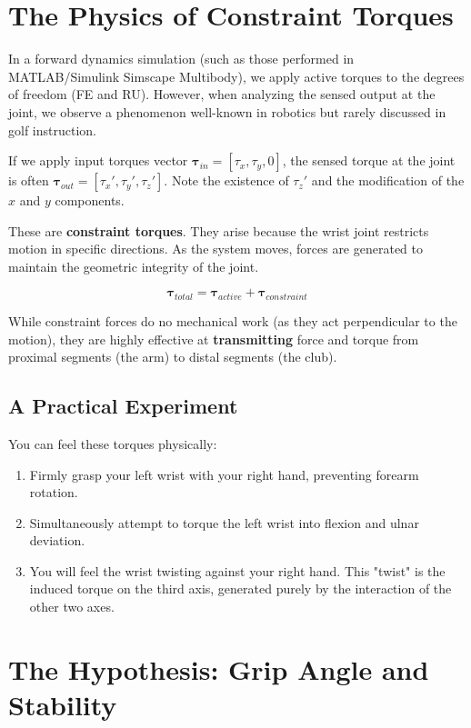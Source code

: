 \documentclass{article}
\begin{document}
\section{The Physics of Constraint Torques}

In a forward dynamics simulation (such as those performed in MATLAB/Simulink Simscape Multibody), we apply active torques to the degrees of freedom (FE and RU). However, when analyzing the sensed output at the joint, we observe a phenomenon well-known in robotics but rarely discussed in golf instruction.

If we apply input torques vector $\boldsymbol{\tau}_{in} = [\tau_x, \tau_y, 0]$, the sensed torque at the joint is often $\boldsymbol{\tau}_{out} = [\tau_x', \tau_y', \tau_z']$. Note the existence of $\tau_z'$ and the modification of the $x$ and $y$ components.

These are \textbf{constraint torques}. They arise because the wrist joint restricts motion in specific directions. As the system moves, forces are generated to maintain the geometric integrity of the joint.

$$ \boldsymbol{\tau}_{total} = \boldsymbol{\tau}_{active} + \boldsymbol{\tau}_{constraint} $$

While constraint forces do no mechanical work (as they act perpendicular to the motion), they are highly effective at \textbf{transmitting} force and torque from proximal segments (the arm) to distal segments (the club).

\subsection{A Practical Experiment}
You can feel these torques physically:
\begin{enumerate}
    \item Firmly grasp your left wrist with your right hand, preventing forearm rotation.
    \item Simultaneously attempt to torque the left wrist into flexion and ulnar deviation.
    \item You will feel the wrist twisting against your right hand. This "twist" is the induced torque on the third axis, generated purely by the interaction of the other two axes.
\end{enumerate}

\section{The Hypothesis: Grip Angle and Stability}
\end{document}
